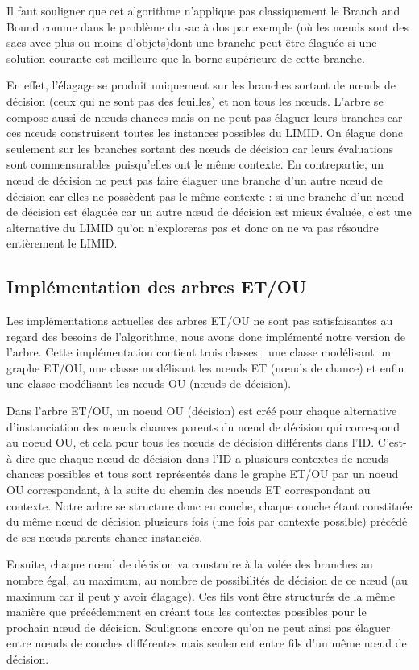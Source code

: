 \documentclass[12pt]{article}
\begin{document}
Il faut souligner que cet algorithme n'applique pas classiquement le Branch and Bound comme dans le problème du sac à dos par exemple (où les nœuds sont des sacs avec plus ou moins d'objets)dont une branche peut être élaguée si une solution courante est meilleure que la borne supérieure de cette branche. 

En effet, l'élagage se produit uniquement sur les branches sortant de nœuds de décision (ceux qui ne sont pas des feuilles) et non tous les nœuds. L'arbre se compose  aussi de nœuds chances mais on ne peut pas élaguer leurs branches car ces nœuds construisent toutes les instances possibles du LIMID. On élague donc seulement sur les branches sortant des nœuds de décision car leurs évaluations sont commensurables puisqu'elles ont le même contexte. En contrepartie, un nœud de décision ne peut pas faire élaguer une branche d'un autre nœud de décision car elles ne possèdent pas le même contexte : si une branche d'un nœud de décision est élaguée car un autre nœud de décision est mieux évaluée, c'est une alternative du LIMID qu'on n'exploreras pas et donc on ne va pas résoudre entièrement le LIMID.


\subsection{Implémentation des arbres ET/OU}
Les implémentations actuelles des arbres ET/OU ne sont pas satisfaisantes au regard des besoins de l'algorithme, nous avons donc implémenté notre version de l'arbre. Cette implémentation contient trois classes : une classe modélisant un graphe ET/OU, une classe modélisant les nœuds ET (nœuds de chance) et enfin une classe modélisant les nœuds OU (nœuds de décision).

Dans l'arbre ET/OU, un noeud OU (décision) est créé pour chaque alternative d'instanciation des noeuds chances parents du nœud de décision qui correspond au noeud OU, et cela pour tous les nœuds de décision différents dans l'ID. C'est-à-dire que chaque nœud de décision dans l'ID a plusieurs contextes de nœuds chances possibles et tous sont représentés dans le graphe ET/OU par un noeud OU correspondant, à la suite du chemin des noeuds ET correspondant au contexte. Notre arbre se structure donc en couche, chaque couche étant constituée du même nœud de décision plusieurs fois (une fois par contexte possible) précédé de ses nœuds parents chance instanciés. 

Ensuite, chaque nœud de décision va construire à la volée des branches au nombre égal, au maximum, au nombre de possibilités de décision de ce nœud (au maximum car il peut y avoir élagage). Ces fils vont être structurés de la même manière que précédemment en créant tous les contextes possibles pour le prochain nœud de décision. Soulignons encore qu'on ne peut ainsi pas élaguer entre nœuds de couches différentes mais seulement entre fils d'un même nœud de décision.
\end{document}
